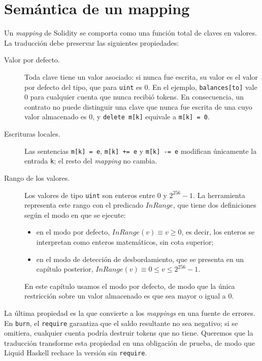 \section{Semántica de un mapping}
\label{sec:mappings-semantica}

Un \emph{mapping} de Solidity se comporta como una función total de claves en
valores. La traducción debe preservar las siguientes propiedades:

\begin{description}
  \item[Valor por defecto.] Toda clave tiene un valor asociado: si nunca fue escrita,
    su valor es el valor por defecto del tipo, que para \lstinline|uint| es $0$. En el
    ejemplo, \lstinline|balances[to]| vale $0$ para cualquier cuenta que nunca recibió
    tokens. En consecuencia, un contrato no puede distinguir una clave que nunca fue
    escrita de una cuyo valor almacenado es $0$, y \lstinline|delete m[k]| equivale a
    \lstinline|m[k] = 0|.
  \item[Escrituras locales.] Las sentencias \lstinline|m[k] = e|, \lstinline|m[k] += e|
    y \lstinline|m[k] -= e| modifican únicamente la entrada \lstinline|k|; el resto
    del \emph{mapping} no cambia.
  \item[Rango de los valores.] Los valores de tipo \lstinline|uint| son enteros entre
    $0$ y $2^{256}-1$. La herramienta representa este rango con el predicado
    $\mathit{InRange}$, que tiene dos definiciones según el modo en que se ejecute:
    \begin{itemize}
      \item en el modo por defecto, $\mathit{InRange}(v) \equiv v \geq 0$, es decir,
        los enteros se interpretan como enteros matemáticos, sin cota superior;
      \item en el modo de detección de desbordamiento, que se presenta en un capítulo
        posterior, $\mathit{InRange}(v) \equiv 0 \leq v \leq 2^{256}-1$.
    \end{itemize}
    En este capítulo usamos el modo por defecto, de modo que la única restricción
    sobre un valor almacenado es que sea mayor o igual a $0$.
\end{description}

La última propiedad es la que convierte a los \emph{mappings} en una fuente de
errores. En \lstinline|burn|, el \lstinline|require| garantiza que el saldo resultante
no sea negativo; si se omitiera, cualquier cuenta podría destruir tokens que no tiene.
Queremos que la traducción transforme esta propiedad en una obligación de prueba,
de modo que Liquid Haskell rechace la versión sin \lstinline|require|.

